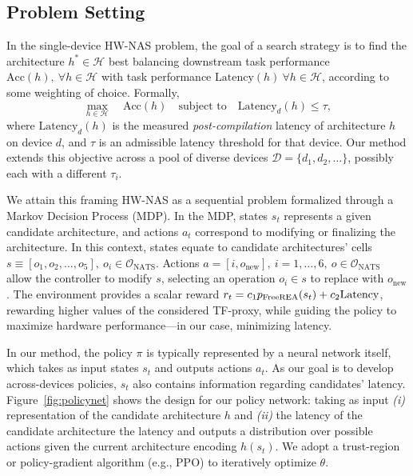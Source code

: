 \label{sec:method}


\subsection{Problem Setting}
\label{subsec:problem_setting}

In the single-device HW-NAS problem, the goal of a search strategy is to find the architecture \(h^* \in \mathcal{H}\) best balancing downstream task performance \( \text{Acc}(h), \ \forall h \in \mathcal H \) with task performance \( \text{Latency}(h) \ \forall h \in \mathcal H \), according to some weighting of choice.
Formally, 
\[
    \underset{h \in \mathcal{H}}{\max} \quad \text{Acc}(h) \quad \text{subject to} \quad \text{Latency}_d(h) \leq \tau,
\]
where \( \mathrm{Latency}_{d}(h) \) is the measured \emph{post-compilation} latency of architecture \( h \) on device \( d \), and \( \tau \) is an admissible latency threshold for that device. 
Our method extends this objective across a pool of diverse devices \( \mathcal D = \{d_1, d_2, \dots \} \), possibly each with a different \( \tau_i \).

We attain this framing HW-NAS as a sequential problem formalized through a Markov Decision Process (MDP). 
In the MDP, states \( s_t \) represents a given candidate architecture, and actions \( a_t \) correspond to modifying or finalizing the architecture. 
In this context, states equate to candidate architectures' cells \( s \equiv [ o_1, o_2, \dots, o_5 ], \ o_i \in \mathcal O_{\text{NATS}} \). Actions \( a = [i, o_\text{new}], \ i=1, \dots, 6, \ o \in \mathcal O_\text{NATS} \) allow the controller to modify \( s \), selecting an operation \( o_i \in s \) to replace with \( o_\text{new} \).
The environment provides a scalar reward \( r_t = c_1 p_\text{FreeREA}(s_t) + c_2 \text{Latency} \), rewarding higher values of the considered TF-proxy, while guiding the policy to maximize hardware performance---in our case, minimizing latency.

In our method, the policy \( \pi \) is typically represented by a neural network itself, which takes as input states \( s_t \) and outputs actions \( a_t \). 
As our goal is to develop across-devices policies, \( s_t \) also contains information regarding candidates' latency. 
Figure~\ref{fig:policynet} shows the design for our policy network: taking as input \emph{(i)} representation of the candidate architecture \( h \) and \emph{(ii)} the latency of the candidate architecture the latency and  outputs a distribution over possible actions given the current architecture encoding $h(s_t)$. We adopt a trust-region or policy-gradient algorithm (e.g., PPO) to iteratively optimize $\theta$. 

